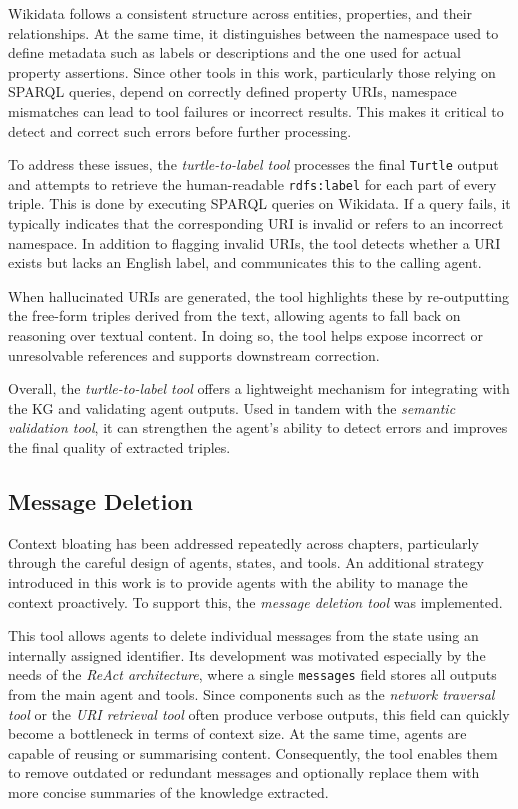\documentclass[a4paper,oneside,bibliography=totoc]{scrbook}
\begin{document}
Wikidata follows a consistent structure across entities, properties, and their relationships. At the same time, it distinguishes between the namespace used to define metadata such as labels or descriptions and the one used for actual property assertions. Since other tools in this work, particularly those relying on \ac{SPARQL} queries, depend on correctly defined property \acp{URI}, namespace mismatches can lead to tool failures or incorrect results. This makes it critical to detect and correct such errors before further processing.

To address these issues, the \textit{turtle-to-label tool} processes the final \texttt{Turtle} output and attempts to retrieve the human-readable \texttt{rdfs:label} for each part of every triple. This is done by executing \ac{SPARQL} queries on Wikidata. If a query fails, it typically indicates that the corresponding \ac{URI} is invalid or refers to an incorrect namespace. In addition to flagging invalid \acp{URI}, the tool detects whether a \ac{URI} exists but lacks an English label, and communicates this to the calling agent.

When hallucinated \acp{URI} are generated, the tool highlights these by re-outputting the free-form triples derived from the text, allowing agents to fall back on reasoning over textual content. In doing so, the tool helps expose incorrect or unresolvable references and supports downstream correction.

Overall, the \textit{turtle-to-label tool} offers a lightweight mechanism for integrating with the \ac{KG} and validating agent outputs. Used in tandem with the \textit{semantic validation tool}, it can strengthen the agent’s ability to detect errors and improves the final quality of extracted triples.

\subsection{Message Deletion}
\label{subsec:message_deletion}

Context bloating has been addressed repeatedly across chapters, particularly through the careful design of agents, states, and tools. An additional strategy introduced in this work is to provide agents with the ability to manage the context proactively. To support this, the \textit{message deletion tool} was implemented.

This tool allows agents to delete individual messages from the state using an internally assigned identifier. Its development was motivated especially by the needs of the \textit{ReAct architecture}, where a single \texttt{messages} field stores all outputs from the main agent and tools. Since components such as the \textit{network traversal tool} or the \textit{\ac{URI} retrieval tool} often produce verbose outputs, this field can quickly become a bottleneck in terms of context size. At the same time, agents are capable of reusing or summarising content. Consequently, the tool enables them to remove outdated or redundant messages and optionally replace them with more concise summaries of the knowledge extracted.
\end{document}
